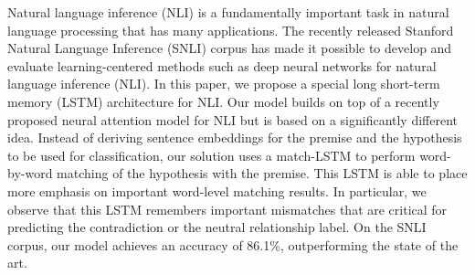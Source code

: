 Natural language inference (NLI) is a fundamentally important task in natural language processing that has many applications. The recently released Stanford Natural Language Inference (SNLI) corpus has made it possible to develop and evaluate learning-centered methods such as deep neural networks for natural language inference (NLI). In this paper, we propose a special long short-term memory (LSTM) architecture for NLI. Our model builds on top of a recently proposed neural attention model for NLI but is based on a   significantly different idea. Instead of deriving sentence embeddings for the premise and the hypothesis to be used for classification, our solution uses a match-LSTM to perform word-by-word matching of the hypothesis with the premise. This LSTM is able to place more emphasis on important word-level matching results. In particular, we observe that this LSTM remembers important mismatches that are critical for predicting the contradiction or the neutral relationship label. On the SNLI corpus, our model achieves an accuracy of 86.1\%, outperforming the state of the art.
